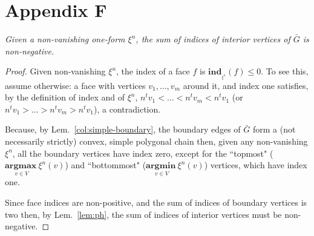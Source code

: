 \documentclass[11pt]{article}
\begin{document}
\section*{Appendix F}\label{app:interior}



\emph{
	Given a non-vanishing one-form $\xi^n$, the sum of indices of interior vertices of $\bar{G}$ is non-negative. 
}
\begin{proof}
Given non-vanishing $\xi^n$, 
the index of a face $f$ is $\mathbf{ind}_{_{\xi^n}}(f) \le 0$. 
To see this, assume otherwise: a face with vertices $v_1,\dots,v_m$ around it, and index one satisfies, by the
definition of index and of $\xi^n$, 
$n^t v_1 < \dots < n^t v_m < n^t v_1$ 
(or $n^t v_1 > \dots > n^t v_m > n^t v_1$), a
contradiction. 

Because, by Lem.~\ref{col:simple-boundary}, the boundary edges of $\bar{G}$ form a (not necessarily
strictly) convex, simple polygonal chain then, given any non-vanishing $\xi^n$, all the boundary vertices have
index zero, except for the ``topmost" ($\underset{v\in V}{\mathbf{argmax\ }} \xi^n(v)$) 
and ``bottommost" ($\underset{v\in V}{\mathbf{argmin\ }} \xi^n(v)$) vertices, which have
index one. 

Since face indices are non-positive, and the sum of indices of
boundary vertices is two then, by Lem.~\ref{lem:ph},
the sum of indices of {interior} vertices must be non-negative. 
\end{proof}
\end{document}

